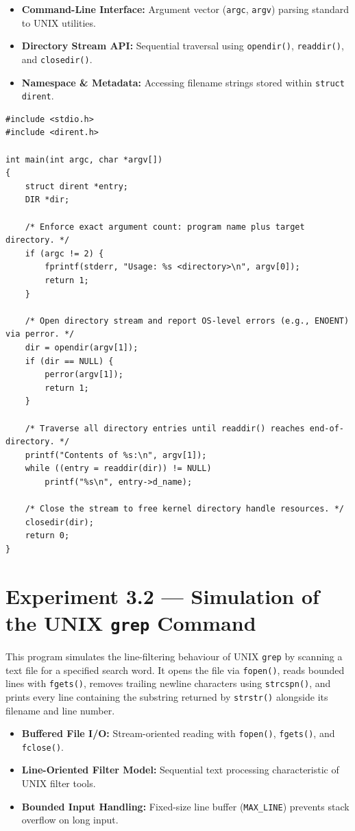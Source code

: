 \documentclass[11pt,a4paper]{article}
\newcommand{\exptheader}[3]{%
    \section[#1: #2]{#1 --- #2}%
    \label{#3}%
}
\begin{document}
\begin{itemize}
    \item \textbf{Command-Line Interface:} Argument vector (\texttt{argc}, \texttt{argv}) parsing standard to UNIX utilities.
    \item \textbf{Directory Stream API:} Sequential traversal using \texttt{opendir()}, \texttt{readdir()}, and \texttt{closedir()}.
    \item \textbf{Namespace \& Metadata:} Accessing filename strings stored within \texttt{struct dirent}.
\end{itemize}

\begin{lstlisting}[title={\texttt{expt\_3\_1.c}}]
#include <stdio.h>
#include <dirent.h>

int main(int argc, char *argv[])
{
    struct dirent *entry;
    DIR *dir;

    /* Enforce exact argument count: program name plus target directory. */
    if (argc != 2) {
        fprintf(stderr, "Usage: %s <directory>\n", argv[0]);
        return 1;
    }

    /* Open directory stream and report OS-level errors (e.g., ENOENT) via perror. */
    dir = opendir(argv[1]);
    if (dir == NULL) {
        perror(argv[1]);
        return 1;
    }

    /* Traverse all directory entries until readdir() reaches end-of-directory. */
    printf("Contents of %s:\n", argv[1]);
    while ((entry = readdir(dir)) != NULL)
        printf("%s\n", entry->d_name);

    /* Close the stream to free kernel directory handle resources. */
    closedir(dir);
    return 0;
}
\end{lstlisting}

\exptheader{Experiment 3.2}{Simulation of the UNIX \texttt{grep} Command}{exp:3.2}

This program simulates the line-filtering behaviour of UNIX \texttt{grep} by scanning a text file for a specified search word. It opens the file via \texttt{fopen()}, reads bounded lines with \texttt{fgets()}, removes trailing newline characters using \texttt{strcspn()}, and prints every line containing the substring returned by \texttt{strstr()} alongside its filename and line number.

\begin{itemize}
    \item \textbf{Buffered File I/O:} Stream-oriented reading with \texttt{fopen()}, \texttt{fgets()}, and \texttt{fclose()}.
    \item \textbf{Line-Oriented Filter Model:} Sequential text processing characteristic of UNIX filter tools.
    \item \textbf{Bounded Input Handling:} Fixed-size line buffer (\texttt{MAX\_LINE}) prevents stack overflow on long input.
\end{itemize}
\end{document}
